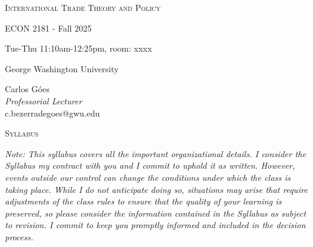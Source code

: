 \documentclass[11pt]{article}
\begin{document}
	
	\textsc{   }
	\bigskip
	
	\begin{center}
		\Large{\textsc{International Trade Theory and Policy}}
		
		\Large{ECON 2181 - Fall 2025}
		
		\LARGE{Tue-Thu 11:10am-12:25pm, room: xxxx }
		
		\Large{George Washington University}
		
	
		
		
	\end{center}

	
\medskip
	
	\begin{center}
			Carlos Góes  \\
			\textit{Professorial Lecturer}\\
			c.bezerradegoes@gwu.edu\\
	\end{center}	
		\medskip
		
	\bigskip





\begin{center}
\Large{\textsc{Syllabus}} 
\end{center}

\bigskip

\noindent \textit{\noindent Note: This syllabus covers all the important organizational details. I consider the Syllabus my contract with you and I commit to uphold it as written. However,  events outside our control can change the conditions under which the class is taking place. While I do not anticipate doing so, situations may arise that require adjustments of the class rules to ensure that the quality of your learning is preserved, so please consider the information contained in the Syllabus as subject to revision. I commit to keep you promptly informed and included in the decision process.}
\bigskip
\end{document}
